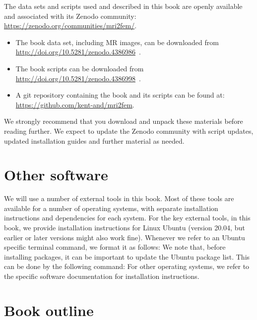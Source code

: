 
The data sets and scripts used and described in this book are openly
available and associated with its Zenodo community:
\url{https://zenodo.org/communities/mri2fem/}. 
\begin{itemize}
\item
  The book data set, including MR images, can be downloaded from \\
  \url{http://doi.org/10.5281/zenodo.4386986}~\cite{kent_andre_mardal_2020_4386986}.
\item
  The book scripts can be downloaded from \\
  \url{http://doi.org/10.5281/zenodo.4386998}~\cite{kent_andre_mardal_2020_4386998}.
\item 
  A git repository containing the book and its scripts can be found 
  at: \\ \url{https://github.com/kent-and/mri2fem}.
\end{itemize}
We strongly recommend that you download and unpack these materials
before reading further. We expect to update the Zenodo community with
script updates, updated installation guides and further material as
needed.
 
\section{Other software}
We will use a number of external tools in this book. Most of these
tools are available for a number of operating systems, with separate
installation instructions and dependencies for each system. For the
key external tools, in this book, we provide installation instructions for Linux
Ubuntu (version 20.04, but earlier or later versions might also work
fine). Whenever we refer to an Ubuntu specific terminal command, we
format it as follows:
\noindent We note that, before installing packages, it can be important to update
the Ubuntu package list. This can be done by the following command:
\noindent For other operating systems, we refer to the specific
software documentation for installation instructions.

\section{Book outline}

